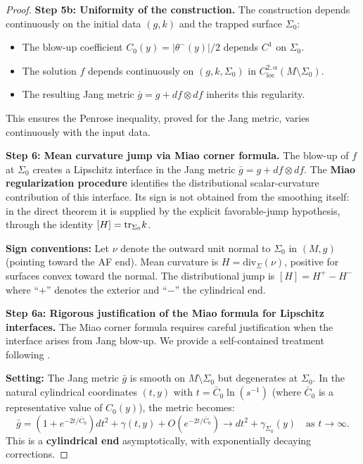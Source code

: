 \begin{proof}
\textbf{Step 5b: Uniformity of the construction.}
The construction depends continuously on the initial data $(g, k)$ and the trapped surface $\Sigma_0$:
\begin{itemize}
    \item The blow-up coefficient $C_0(y) = |\theta^-(y)|/2$ depends $C^1$ on $\Sigma_0$.
    \item The solution $f$ depends continuously on $(g, k, \Sigma_0)$ in $C^{2,\alpha}_{\text{loc}}(M \setminus \Sigma_0)$.
    \item The resulting Jang metric $\bar{g} = g + df \otimes df$ inherits this regularity.
\end{itemize}
This ensures the Penrose inequality, proved for the Jang metric, varies continuously with the input data.

\textbf{Step 6: Mean curvature jump via Miao corner formula.}
The blow-up of $f$ at $\Sigma_0$ creates a Lipschitz interface in the Jang metric $\bar{g} = g + df \otimes df$. The \textbf{Miao regularization procedure} \cite{miao2002} identifies the distributional scalar-curvature contribution of this interface. Its sign is not obtained from the smoothing itself: in the direct theorem it is supplied by the explicit favorable-jump hypothesis, through the identity $[H]=\mathrm{tr}_{\Sigma_0}k$.

\textbf{Sign conventions:} Let $\nu$ denote the outward unit normal to $\Sigma_0$ in $(M, g)$ (pointing toward the AF end). Mean curvature is $H = \mathrm{div}_\Sigma(\nu)$, positive for surfaces convex toward the normal. The distributional jump is $[H] = H^+ - H^-$ where ``$+$'' denotes the exterior and ``$-$'' the cylindrical end.

\textbf{Step 6a: Rigorous justification of the Miao formula for Lipschitz interfaces.}
The Miao corner formula requires careful justification when the interface arises from Jang blow-up. We provide a self-contained treatment following \cite{miao2002,shi2016}.

\textbf{Setting:} The Jang metric $\bar{g}$ is smooth on $M \setminus \Sigma_0$ but degenerates at $\Sigma_0$. In the natural cylindrical coordinates $(t, y)$ with $t = \bar{C}_0 \ln(s^{-1})$ (where $\bar{C}_0$ is a representative value of $C_0(y)$), the metric becomes:
\[
    \bar{g} = (1 + e^{-2t/\bar{C}_0}) dt^2 + \gamma(t, y) + O(e^{-2t/\bar{C}_0}) \to dt^2 + \gamma_{\Sigma_0}(y) \quad \text{as } t \to \infty.
\]
This is a \textbf{cylindrical end} asymptotically, with exponentially decaying corrections.


\end{proof}
